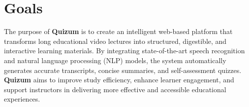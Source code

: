 \section{Goals}
The purpose of \textbf{Quizum} is to create an intelligent web-based platform that transforms long educational video lectures into structured, digestible, and interactive learning materials. By integrating state-of-the-art speech recognition and natural language processing (NLP) models, the system automatically generates accurate transcripts, concise summaries, and self-assessment quizzes. \textbf{Quizum} aims to improve study efficiency, enhance learner engagement, and support instructors in delivering more effective and accessible educational experiences.
